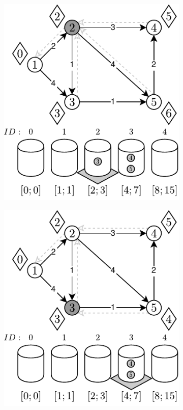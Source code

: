 \begin{figure}[!htbp]
\begin{subfigure}[b]{0.28\textwidth}
		\caption{}
	\end{subfigure}
	\begin{subfigure}[b]{0.28\textwidth}
		\includegraphics[width=\textwidth]{Chapter_II/RADIX-HEAP-NC-Example/c.pdf}
		\caption{}
	\end{subfigure}
	\qquad
	\begin{subfigure}[b]{0.28\textwidth}
		\includegraphics[width=\textwidth]{Chapter_II/RADIX-HEAP-NC-Example/d.pdf}

\end{subfigure}
\end{figure}
